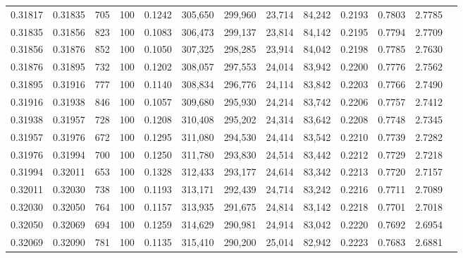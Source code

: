 \begin{tabular}{rrrrrrrrrrrrr}
0.31817 & 0.31835 &   705 & 100 &                                     0.1242 & 305,650 & 299,960 &  23,714 &  84,242 & 0.2193 & 0.7803 & 2.7785 \\
0.31835 & 0.31856 &   823 & 100 &                                     0.1083 & 306,473 & 299,137 &  23,814 &  84,142 & 0.2195 & 0.7794 & 2.7709 \\
0.31856 & 0.31876 &   852 & 100 &                                     0.1050 & 307,325 & 298,285 &  23,914 &  84,042 & 0.2198 & 0.7785 & 2.7630 \\
0.31876 & 0.31895 &   732 & 100 &                                     0.1202 & 308,057 & 297,553 &  24,014 &  83,942 & 0.2200 & 0.7776 & 2.7562 \\
0.31895 & 0.31916 &   777 & 100 &                                     0.1140 & 308,834 & 296,776 &  24,114 &  83,842 & 0.2203 & 0.7766 & 2.7490 \\
0.31916 & 0.31938 &   846 & 100 &                                     0.1057 & 309,680 & 295,930 &  24,214 &  83,742 & 0.2206 & 0.7757 & 2.7412 \\
0.31938 & 0.31957 &   728 & 100 &                                     0.1208 & 310,408 & 295,202 &  24,314 &  83,642 & 0.2208 & 0.7748 & 2.7345 \\
0.31957 & 0.31976 &   672 & 100 &                                     0.1295 & 311,080 & 294,530 &  24,414 &  83,542 & 0.2210 & 0.7739 & 2.7282 \\
0.31976 & 0.31994 &   700 & 100 &                                     0.1250 & 311,780 & 293,830 &  24,514 &  83,442 & 0.2212 & 0.7729 & 2.7218 \\
0.31994 & 0.32011 &   653 & 100 &                                     0.1328 & 312,433 & 293,177 &  24,614 &  83,342 & 0.2213 & 0.7720 & 2.7157 \\
0.32011 & 0.32030 &   738 & 100 &                                     0.1193 & 313,171 & 292,439 &  24,714 &  83,242 & 0.2216 & 0.7711 & 2.7089 \\
0.32030 & 0.32050 &   764 & 100 &                                     0.1157 & 313,935 & 291,675 &  24,814 &  83,142 & 0.2218 & 0.7701 & 2.7018 \\
0.32050 & 0.32069 &   694 & 100 &                                     0.1259 & 314,629 & 290,981 &  24,914 &  83,042 & 0.2220 & 0.7692 & 2.6954 \\
0.32069 & 0.32090 &   781 & 100 &                                     0.1135 & 315,410 & 290,200 &  25,014 &  82,942 & 0.2223 & 0.7683 & 2.6881 \\

\end{tabular}
